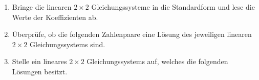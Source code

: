 \documentclass[11pt,oneside]{article}
\begin{document}
	\begin{aufgabe}
		\begin{enumerate}
			\item Bringe die linearen $2\times2$ Gleichungssysteme in die Standardform und lese die Werte der Koeffizienten ab.
			\item Überprüfe, ob die folgenden Zahlenpaare eine Lösung des jeweiligen linearen $2\times2$ Gleichungssystems sind.
			\item Stelle ein lineares $2\times2$ Gleichungssystems auf, welches die folgenden Lösungen besitzt.
		\end{enumerate}
	\end{aufgabe}
	\newpage
\end{document}
